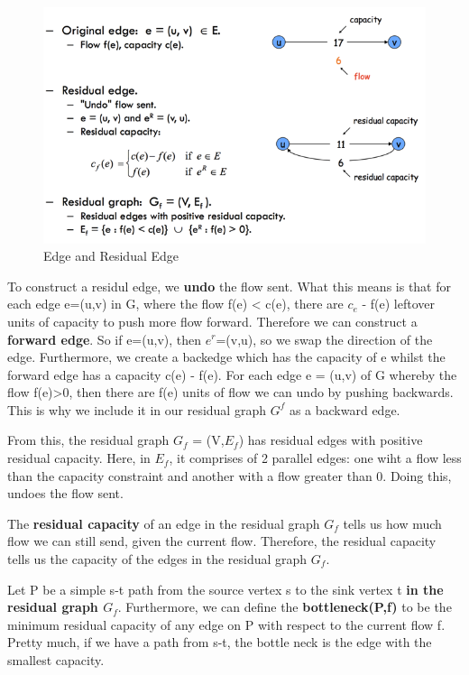 \documentclass[11pt, oneside]{article}
\theoremstyle{definition}
\begin{document}
\begin{figure}
  \includegraphics[width=\linewidth]{images/Week_9/ResidualEdge.jpg}
  \caption{Edge and Residual Edge}
  \label{ResidualEdge}
\end{figure}

To construct a residul edge, we \textbf{undo} the flow sent. What this means is that for each edge e=(u,v) in G, where the flow f(e) < c(e), there are $c_e$ - f(e) leftover units of capacity to push more flow forward. Therefore we can construct a \textbf{forward edge}. So if e=(u,v), then $e^{r}$=(v,u), so we swap the direction of the edge. Furthermore, we create a backedge which has the capacity of e whilst the forward edge has a capacity c(e) - f(e). For each edge e = (u,v) of G whereby the flow f(e)>0, then there are f(e) units of flow we can undo by pushing backwards. This is why we include it in our residual graph $G^f$ as a backward edge.

From this, the residual graph $G_f$ = (V,$E_f$) has residual edges with positive residual capacity. Here, in $E_f$, it comprises of 2 parallel edges: one wiht a flow less than the capacity constraint and another with a flow greater than 0. Doing this, undoes the flow sent.

The \textbf{residual capacity} of an edge in the residual graph $G_f$ tells us how much flow we can still send, given the current flow. Therefore, the residual capacity tells us the capacity of the edges in the residual graph $G_f$.

Let P be a simple s-t path from the source vertex s to the sink vertex t \textbf{in the residual graph $G_f$}. Furthermore, we can define the \textbf{bottleneck(P,f)} to be the minimum residual capacity of any edge on P with respect to the current flow f. Pretty much, if we have a path from s-t, the bottle neck is the edge with the smallest capacity.
\end{document}
